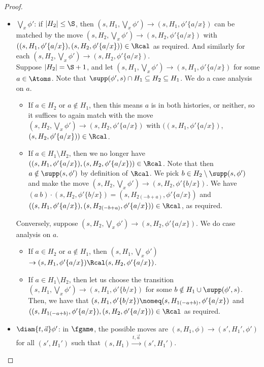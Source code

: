 \begin{proof}
\begin{itemize}
                \item $\bigvee_x \phi'$: 
        if $|H_2| \le \S$, then $(s, H_1, \bigvee_x \phi') \rightarrow (s, H_1, \phi'\{a/x\})$ can be matched by the move $(s, H_2, \bigvee_x \phi') \rightarrow (s, H_2, \phi'\{a/x\})$ with $((s, H_1, \phi'\{a/x\}), (s, H_2, \phi'\{a/x\})) \in \Rcal$ as required. And similarly for each $(s, H_2, \bigvee_x \phi') \rightarrow (s, H_2, \phi'\{a/x\})$.
        \\
        Suppose $|H_2| = \S+1$, and
        let $(s, H_1, \bigvee_x \phi') \rightarrow (s, H_1, \phi'\{a/x\})$ for some $a \in \Atoms$.
Note that $\supp(\phi', s) \cap H_1 \subseteq H_2 \subseteq H_1$. We do a case analysis on $a$.
        \begin{itemize}
            \item 
        If $a \in H_2$ or $a\notin H_1$, then this means $a$ is in both histories, or neither, so it suffices to again match with the move $(s, H_2, \bigvee_x \phi') \rightarrow (s, H_2, \phi'\{a/x\})$ with $((s, H_1, \phi'\{a/x\})$, $(s, H_2, \phi'\{a/x\})) \in \Rcal$. 
        \item
        If $a \in H_1 \setminus H_2$, then we no longer have 
        $((s, H_1, \phi'\{a/x\}),(s, H_2, \phi'\{a/x\})) \in \Rcal$. 
        Note that then $a\notin\supp(s,\phi')$ by definition of $\Rcal$. 
        We pick $b\in H_2\setminus\supp(s,\phi')$ and make the move
        $(s, H_2, \bigvee_x \phi') \rightarrow (s, H_2, \phi'\{b/x\})$. We have $(a\ b)\cdot(s, H_2, \phi'\{b/x\})=(s, H_{2(-b+a)}, \phi'\{a/x\})$ and
        $((s, H_1, \phi'\{a/x\}),(s, H_{2(-b+a)}, \phi'\{a/x\})) \in \Rcal$, as required.
                \end{itemize}
        Conversely, suppose $(s, H_2, \bigvee_x \phi')\to(s, H_2, \phi'\{a/x\})$. We do case analysis on $a$.
        \begin{itemize}
        \item If $a \in H_2$ or $a \notin H_1$, then
          $(s, H_1, \bigvee_x \phi')$ $ \rightarrow (s, H_1, \phi'\{a/x\})\Rcal(s, H_2, \phi'\{a/x\})$.
                        \item If $a \in H_1 \setminus H_2$, then let us choose the transition $(s, H_1, \bigvee_x \phi') \to (s, H_1, \phi'\{b/x\})$ for some $b \notin H_1 \cup \supp(\phi', s)$.
            Then, we have that $(s, H_1, \phi'\{b/x\}) \nomeq (s, H_{1(-a+b)}, \phi'\{a/x\})$ and $((s, H_{1(-a+b)}, \phi'\{a/x\}),(s, H_2, \phi'\{a/x\})) \in \Rcal$ as required.
        \end{itemize}
                        \item $\diam{t, \vec a} \phi'$: in $\fgame$, the possible moves are $(s, H_1, \phi) \rightarrow (s', H_1', \phi')$ for all $(s', H_1')$ such that $(s, H_1) \xrightarrow{t, \vec a} (s', H_1')$.

\end{itemize}
\end{proof}
